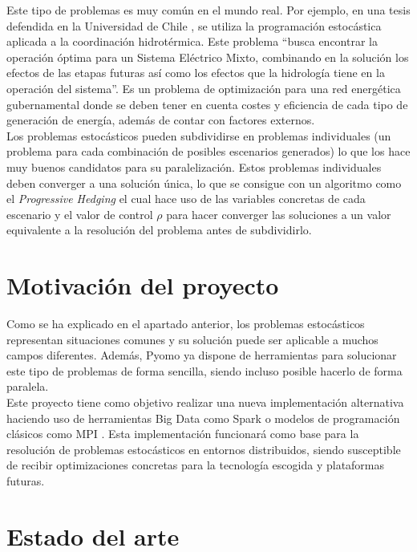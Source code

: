 Este tipo de problemas es muy común en el mundo real. Por ejemplo, en una tesis defendida en la Universidad de Chile \cite{thesisHydro}, se utiliza la programación estocástica aplicada a la coordinación hidrotérmica. Este problema ``busca encontrar la operación óptima para un Sistema Eléctrico Mixto, combinando en la solución los efectos de las etapas futuras así como los efectos que la hidrología tiene en la operación del sistema''. Es un problema de optimización para una red energética gubernamental donde se deben tener en cuenta costes y eficiencia de cada tipo de generación de energía, además de contar con factores externos. \\

Los problemas estocásticos pueden subdividirse en problemas individuales (un problema para cada combinación de posibles escenarios generados) lo que los hace muy buenos candidatos para su paralelización. Estos problemas individuales deben converger a una solución única, lo que se consigue con un algoritmo como el \textit{Progressive Hedging} \cite{progressiveHedging} el cual hace uso de las variables concretas de cada escenario y el valor de control $\rho$ para hacer converger las soluciones a un valor equivalente a la resolución del problema antes de subdividirlo.

\section{Motivación del proyecto}


Como se ha explicado en el apartado anterior, los problemas estocásticos representan situaciones comunes y su solución puede ser aplicable a muchos campos diferentes. Además, Pyomo ya dispone de herramientas para solucionar este tipo de problemas de forma sencilla, siendo incluso posible hacerlo de forma paralela.\\

Este proyecto tiene como objetivo realizar una nueva implementación alternativa haciendo uso de herramientas Big Data como Spark \cite{spark} o modelos de programación clásicos como MPI \cite{mpi}. Esta implementación funcionará como base para la resolución de problemas estocásticos en entornos distribuidos, siendo susceptible de recibir optimizaciones concretas para la tecnología escogida y plataformas futuras.

\section{Estado del arte}

